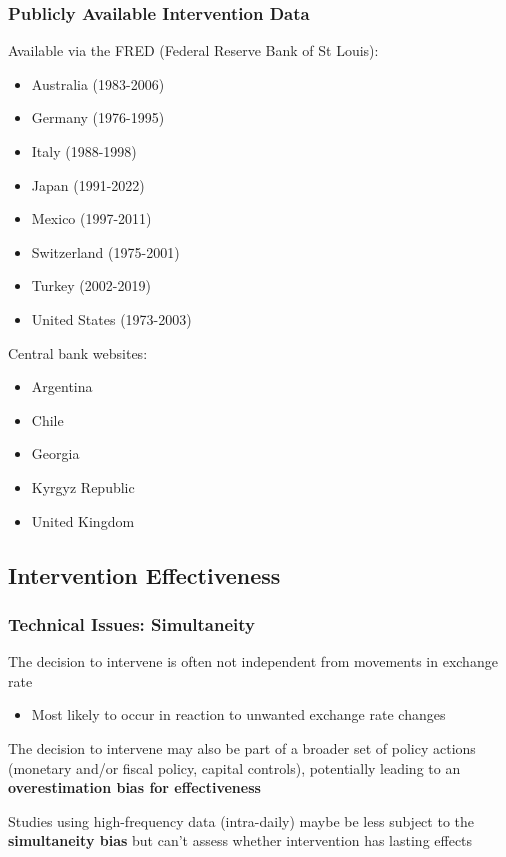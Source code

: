 \documentclass{beamer}
\newenvironment{wideitemize}{\itemize\addtolength{\itemsep}{10pt}}{\enditemize}
\begin{document}
\begin{frame}
  \frametitle{Publicly Available Intervention Data}
  Available via the FRED (Federal Reserve Bank of St Louis):

  \begin{itemize}
  \item Australia (1983-2006)
  \item Germany (1976-1995)
  \item Italy (1988-1998)
  \item Japan (1991-2022)
  \item Mexico (1997-2011)
  \item Switzerland (1975-2001)
  \item Turkey (2002-2019)
  \item United States (1973-2003)
  \end{itemize}

  Central bank websites:
  \begin{itemize}
  \item Argentina
  \item Chile
  \item Georgia
  \item Kyrgyz Republic
  \item United Kingdom
  \end{itemize}  
\end{frame}

\subsection{Intervention Effectiveness}

\begin{frame}
  \frametitle{Technical Issues: Simultaneity}

  \begin{wideitemize}
  \item The decision to intervene is often not independent from movements in exchange rate
    \begin{itemize}
    \item Most likely to occur in reaction to unwanted exchange rate changes
    \end{itemize}
    \item The decision to intervene may also be part of a broader set of policy actions (monetary and/or fiscal policy, capital controls), potentially leading to an \textbf{overestimation bias for effectiveness}
    \item Studies using high-frequency data (intra-daily) maybe be less subject to the \textbf{simultaneity bias} but can't assess whether intervention has lasting effects
  \end{wideitemize}  
\end{frame}
\end{document}
